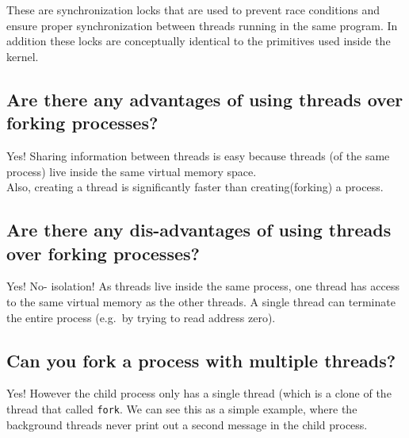 These are synchronization locks that are used to prevent race conditions
and ensure proper synchronization between threads running in the same
program. In addition these locks are conceptually identical to the
primitives used inside the kernel.

\subsection{Are there any advantages of using threads over forking
processes?}\label{are-there-any-advantages-of-using-threads-over-forking-processes}

Yes! Sharing information between threads is easy because threads (of the
same process) live inside the same virtual memory space.\\Also, creating
a thread is significantly faster than creating(forking) a process.

\subsection{Are there any dis-advantages of using threads over forking
processes?}\label{are-there-any-dis-advantages-of-using-threads-over-forking-processes}

Yes! No- isolation! As threads live inside the same process, one thread
has access to the same virtual memory as the other threads. A single
thread can terminate the entire process (e.g.~by trying to read address
zero).

\subsection{Can you fork a process with multiple
threads?}\label{can-you-fork-a-process-with-multiple-threads}

Yes! However the child process only has a single thread (which is a
clone of the thread that called \texttt{fork}. We can see this as a
simple example, where the background threads never print out a second
message in the child process.

